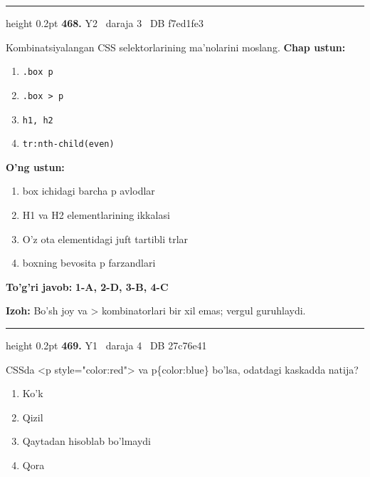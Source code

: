 \documentclass[10pt,a4paper,oneside]{article}
\begin{document}
\vspace{2mm}\hrule height 0.2pt \vspace{4mm}
\hypertarget{q468}{\textbf{\color{ink}468.}}  {\color{muted}\scriptsize Y2 \textbullet\ daraja 3 \textbullet\ DB f7ed1fe3}
\par
Kombinatsiyalangan CSS selektorlarining ma'nolarini moslang.
\textbf{\footnotesize Chap ustun:}
\begin{enumerate}[label=\arabic*),leftmargin=9mm]
\item \texttt{.box p}
\item \texttt{.box \textgreater{} p}
\item \texttt{h1, h2}
\item \texttt{tr:nth-child(even)}
\end{enumerate}
\textbf{\footnotesize O'ng ustun:}
\begin{enumerate}[label=\Alph*),leftmargin=9mm]
\item box ichidagi barcha p avlodlar
\item H1 va H2 elementlarining ikkalasi
\item O'z ota elementidagi juft tartibli trlar
\item boxning bevosita p farzandlari
\end{enumerate}
\begin{tcolorbox}[enhanced,breakable,colback=teal!4,colframe=teal!45!black,boxrule=0.45pt,arc=1.2mm,left=2.8mm,right=2.8mm,top=2mm,bottom=2mm,before skip=2mm,after skip=2mm]
\textbf{\color{teal}To'g'ri javob:} \textbf{1-A, 2-D, 3-B, 4-C}
\par\smallskip
\textbf{Izoh:} Bo'sh joy va \textgreater{} kombinatorlari bir xil emas; vergul guruhlaydi.
\end{tcolorbox}
\vspace{2mm}\hrule height 0.2pt \vspace{4mm}
\hypertarget{q469}{\textbf{\color{ink}469.}}  {\color{muted}\scriptsize Y1 \textbullet\ daraja 4 \textbullet\ DB 27c76e41}
\par
CSSda \textless{}p style="color:red"\textgreater{} va p\{color:blue\} bo'lsa, odatdagi kaskadda natija?
\begin{enumerate}[label=\Alph*),leftmargin=9mm]
\item Ko'k
\item Qizil
\item Qaytadan hisoblab bo'lmaydi
\item Qora
\end{enumerate}
\end{document}
